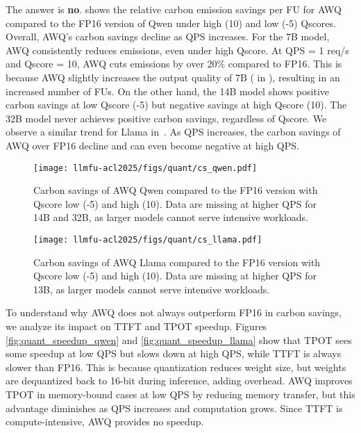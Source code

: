 \noindent The answer is \textbf{no}.  shows the relative carbon emission savings per FU for AWQ compared to the FP16 version of Qwen under high (10) and low (-5) Qscores. Overall, AWQ’s carbon savings decline as QPS increases. For the 7B model, AWQ consistently reduces emissions, even under high Qscore. At QPS = 1 req/s and Qscore = 10, AWQ cuts emissions by over 20\% compared to FP16. This is because AWQ slightly increases the output quality of 7B ( in ), resulting in an increased number of FUs. On the other hand, the 14B model shows positive carbon savings at low Qscore (-5) but negative savings at high Qscore (10). The 32B model never achieves positive carbon savings, regardless of Qscore. We observe a similar trend for Llama in~. As QPS increases, the carbon savings of AWQ over FP16 decline and can even become negative at high QPS. 

\begin{figure}[!t]
    \centering
    \texttt{[image: llmfu-acl2025/figs/quant/cs\_qwen.pdf]}
    \vspace{-0.15in}
    \caption{Carbon savings of AWQ Qwen compared to the FP16 version with Qscore low (-5) and high (10). Data are missing at higher QPS for 14B and 32B, as larger models cannot serve intensive workloads.}
    \label{fig:quant_cs_qwen}
\end{figure}

\begin{figure}[!t]
    \centering
    \texttt{[image: llmfu-acl2025/figs/quant/cs\_llama.pdf]}
    \vspace{-0.15in}
    \caption{Carbon savings of AWQ Llama compared to the FP16 version with Qscore low (-5) and high (10). Data are missing at higher QPS for 13B, as larger models cannot serve intensive workloads.}
    \label{fig:quant_cs_llama}
\end{figure}

To understand why AWQ does not always outperform FP16 in carbon savings, we analyze its impact on TTFT and TPOT speedup. Figures \ref{fig:quant_speedup_qwen} and \ref{fig:quant_speedup_llama} show that TPOT sees some speedup at low QPS but slows down at high QPS, while TTFT is always slower than FP16. This is because quantization reduces weight size, but weights are dequantized back to 16-bit during inference, adding overhead. AWQ improves TPOT in memory-bound cases at low QPS by reducing memory transfer, but this advantage diminishes as QPS increases and computation grows. Since TTFT is compute-intensive, AWQ provides no speedup.


